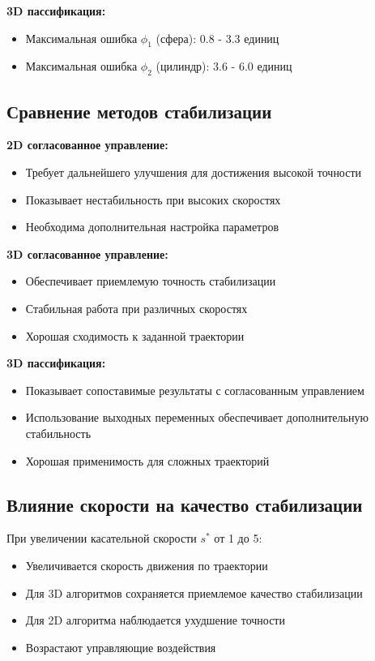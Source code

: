 \textbf{3D пассификация:}
\begin{itemize}
\item Максимальная ошибка $\phi_1$ (сфера): 0.8 - 3.3 единиц
\item Максимальная ошибка $\phi_2$ (цилиндр): 3.6 - 6.0 единиц
\end{itemize}

\subsection{Сравнение методов стабилизации}

\textbf{2D согласованное управление:}
\begin{itemize}
\item Требует дальнейшего улучшения для достижения высокой точности
\item Показывает нестабильность при высоких скоростях
\item Необходима дополнительная настройка параметров
\end{itemize}

\textbf{3D согласованное управление:}
\begin{itemize}
\item Обеспечивает приемлемую точность стабилизации
\item Стабильная работа при различных скоростях
\item Хорошая сходимость к заданной траектории
\end{itemize}

\textbf{3D пассификация:}
\begin{itemize}
\item Показывает сопоставимые результаты с согласованным управлением
\item Использование выходных переменных обеспечивает дополнительную стабильность
\item Хорошая применимость для сложных траекторий
\end{itemize}

\subsection{Влияние скорости на качество стабилизации}

При увеличении касательной скорости $s^*$ от 1 до 5:
\begin{itemize}
\item Увеличивается скорость движения по траектории
\item Для 3D алгоритмов сохраняется приемлемое качество стабилизации
\item Для 2D алгоритма наблюдается ухудшение точности
\item Возрастают управляющие воздействия
\end{itemize}

